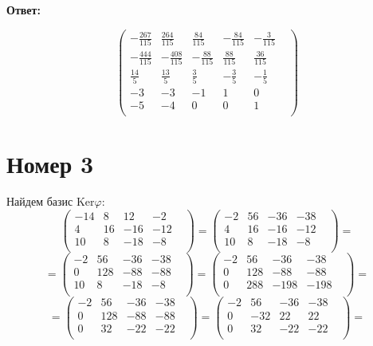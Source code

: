\documentclass[a4paper,12pt]{article}
\begin{document}
{\Large 
\begin{center}
\textbf{Ответ:}
\end{center}\[
\begin{pmatrix}
 -\frac{267}{115} & \frac{264}{115}& \frac{84}{115} & -\frac{84}{115} & -\frac{3}{115} & \\
 -\frac{444}{115 } & -\frac{408}{115} & -\frac{88}{115} & \frac{88}{115} & \frac{36}{115} \\
 \frac{14}{5} & \frac{13}{5} & \frac{3}{5} & -\frac{3}{5} & -\frac{1}{5} \\
 -3 & -3 & -1 & 1 & 0 \\
-5 & -4 & 0 & 0 & 1 \\
\end{pmatrix}
\]}
\clearpage
\section*{Номер 3}
Найдем базис Ker$\varphi$:
\[
\begin{pmatrix}
-14 & 8 & 12 & -2 & \\
4 & 16 & -16 & -12 & \\
10 & 8 & -18 & -8 & \\
\end{pmatrix}
=
\begin{pmatrix}
-2 & 56 & -36 & -38 & \\
4 & 16 & -16 & -12 & \\
10 & 8 & -18 & -8 & \\
\end{pmatrix}
=
\]
\[
=
\begin{pmatrix}
-2 & 56 & -36 & -38 & \\
0 & 128 & -88 & -88 & \\
10 & 8 & -18 & -8 & \\
\end{pmatrix}
=
\begin{pmatrix}
-2 & 56 & -36 & -38 & \\
0 & 128 & -88 & -88 & \\
0 & 288 & -198 & -198 & \\
\end{pmatrix}
=
\]
\[
=
\begin{pmatrix}
-2 & 56 & -36 & -38 & \\
0 & 128 & -88 & -88 & \\
0 & 32 & -22 & -22 & \\
\end{pmatrix}
=
\begin{pmatrix}
-2 & 56 & -36 & -38 & \\
0 & -32 & 22 & 22 & \\
0 & 32 & -22 & -22 & \\
\end{pmatrix}
=
\]
\end{document}

